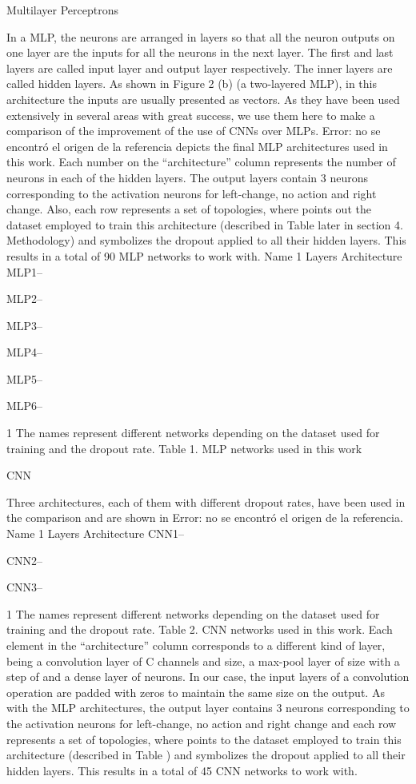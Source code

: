 {Multilayer Perceptrons

In a MLP, the neurons are arranged in layers so that all the neuron outputs on one layer are the inputs for all the neurons in the next layer. The first and last layers are called input layer and output layer respectively. The inner layers are called hidden layers. As shown in Figure 2 (b) (a two-layered MLP), in this architecture the inputs are usually presented as vectors.
As they have been used extensively in several areas with great success, we use them here to make a comparison of the improvement of the use of CNNs over MLPs.
Error: no se encontró el origen de la referencia depicts the final MLP architectures used in this work. Each number on the “architecture” column represents the number of neurons in each of the hidden layers. The output layers contain 3 neurons corresponding to the activation neurons for left-change, no action and right change. Also, each row represents a set of topologies, where  points out the dataset employed to train this architecture (described in Table  later in section 4. Methodology) and  symbolizes the dropout applied to all their hidden layers. This results in a total of 90 MLP networks to work with.
Name 1
Layers
Architecture
MLP1--


MLP2--


MLP3--


MLP4--


MLP5--


MLP6--


1 The names represent different networks depending on the dataset used for training and the dropout rate.
Table 1. MLP networks used in this work

CNN

Three architectures, each of them with different dropout rates, have been used in the comparison and are shown in Error: no se encontró el origen de la referencia.
Name 1
Layers
Architecture
CNN1--


CNN2--


CNN3--


1 The names represent different networks depending on the dataset used for training and the dropout rate.
Table 2. CNN networks used in this work.
Each element in the “architecture” column corresponds to a different kind of layer, being  a convolution layer of C channels and  size,  a max-pool layer of  size with a step of  and  a dense layer of  neurons. In our case, the input layers of a convolution operation are padded with zeros to maintain the same  size on the output. As with the MLP architectures, the output layer contains 3 neurons corresponding to the activation neurons for left-change, no action and right change and each row represents a set of topologies, where  points to the dataset employed to train this architecture (described in Table ) and  symbolizes the dropout applied to all their hidden layers. This results in a total of 45 CNN networks to work with.



}
